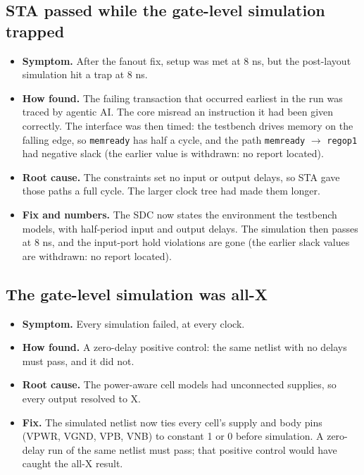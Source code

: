 \documentclass[11pt,letterpaper]{article}
\newcommand{\sk}[1]{\texttt{#1}}
\renewcommand{\_}{\textunderscore\penalty0\hskip0pt\relax}
\begin{document}
\subsection{STA passed while the gate-level simulation trapped}
\begin{itemize}
\item \textbf{Symptom.} After the fanout fix, setup was met at 8 ns, but the post-layout simulation hit a trap at 8 ns.
\item \textbf{How found.} The failing transaction that occurred earliest in the run was traced by agentic AI. The core misread an instruction it had been given correctly. The interface was then timed: the testbench drives memory on the falling edge, so \sk{mem\_ready} has half a cycle, and the path \sk{mem\_ready} $\to$ \sk{reg\_op1} had negative slack (the earlier value is withdrawn: no report located).
\item \textbf{Root cause.} The constraints set no input or output delays, so STA gave those paths a full cycle. The larger clock tree had made them longer.
\item \textbf{Fix and numbers.} The SDC now states the environment the testbench models, with half-period input and output delays. The simulation then passes at 8 ns, and the input-port hold violations are gone (the earlier slack values are withdrawn: no report located).
\end{itemize}

\subsection{The gate-level simulation was all-X}
\begin{itemize}
\item \textbf{Symptom.} Every simulation failed, at every clock.
\item \textbf{How found.} A zero-delay positive control: the same netlist with no delays must pass, and it did not.
\item \textbf{Root cause.} The power-aware cell models had unconnected supplies, so every output resolved to X.
\item \textbf{Fix.} The simulated netlist now ties every cell's supply and body pins (VPWR, VGND, VPB, VNB) to constant 1 or 0 before simulation. A zero-delay run of the same netlist must pass; that positive control would have caught the all-X result.
\end{itemize}
\end{document}
